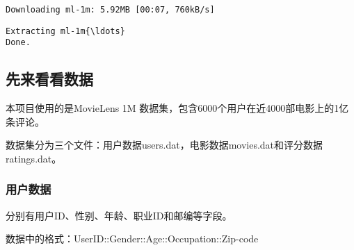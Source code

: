 \documentclass[11pt]{article}
\begin{document}
    \begin{Verbatim}[commandchars=\\\{\}]
Downloading ml-1m: 5.92MB [00:07, 760kB/s]                                                                             

    \end{Verbatim}

    \begin{Verbatim}[commandchars=\\\{\}]
Extracting ml-1m{\ldots}
Done.

    \end{Verbatim}

    \subsection{先来看看数据}\label{ux5148ux6765ux770bux770bux6570ux636e}

    本项目使用的是MovieLens 1M
数据集，包含6000个用户在近4000部电影上的1亿条评论。

数据集分为三个文件：用户数据users.dat，电影数据movies.dat和评分数据ratings.dat。

    \subsubsection{用户数据}\label{ux7528ux6237ux6570ux636e}

分别有用户ID、性别、年龄、职业ID和邮编等字段。

数据中的格式：UserID::Gender::Age::Occupation::Zip-code
\end{document}
